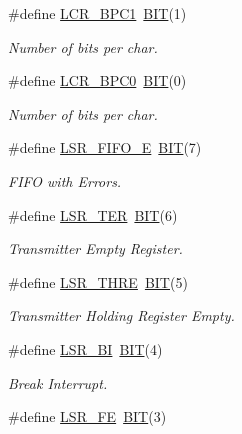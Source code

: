 \begin{DoxyCompactItemize}
\#define \hyperlink{group___serial_ga4271f672ad1c921995a3868074747d19}{L\+C\+R\+\_\+\+B\+P\+C1}~\hyperlink{group___serial_ga3a8ea58898cb58fc96013383d39f482c}{B\+IT}(1)
\begin{DoxyCompactList}\small\item\em Number of bits per char. \end{DoxyCompactList}\item 
\#define \hyperlink{group___serial_gae82a6d40fb6637ebdea0cf527594c3fc}{L\+C\+R\+\_\+\+B\+P\+C0}~\hyperlink{group___serial_ga3a8ea58898cb58fc96013383d39f482c}{B\+IT}(0)
\begin{DoxyCompactList}\small\item\em Number of bits per char. \end{DoxyCompactList}\item 
\#define \hyperlink{group___serial_ga17abffa14207797fba6c62875367d085}{L\+S\+R\+\_\+\+F\+I\+F\+O\+\_\+E}~\hyperlink{group___serial_ga3a8ea58898cb58fc96013383d39f482c}{B\+IT}(7)
\begin{DoxyCompactList}\small\item\em F\+I\+FO with Errors. \end{DoxyCompactList}\item 
\#define \hyperlink{group___serial_ga6b9fdb38c6b844ba25a7dba0f024e20c}{L\+S\+R\+\_\+\+T\+ER}~\hyperlink{group___serial_ga3a8ea58898cb58fc96013383d39f482c}{B\+IT}(6)
\begin{DoxyCompactList}\small\item\em Transmitter Empty Register. \end{DoxyCompactList}\item 
\#define \hyperlink{group___serial_ga8c1a828f5fe296a9c1668cf3e72c00c1}{L\+S\+R\+\_\+\+T\+H\+RE}~\hyperlink{group___serial_ga3a8ea58898cb58fc96013383d39f482c}{B\+IT}(5)
\begin{DoxyCompactList}\small\item\em Transmitter Holding Register Empty. \end{DoxyCompactList}\item 
\#define \hyperlink{group___serial_ga0fa2f414cac085b768774f2881321b60}{L\+S\+R\+\_\+\+BI}~\hyperlink{group___serial_ga3a8ea58898cb58fc96013383d39f482c}{B\+IT}(4)
\begin{DoxyCompactList}\small\item\em Break Interrupt. \end{DoxyCompactList}\item 
\#define \hyperlink{group___serial_gae3f9ccc88c615d1257ad400cf27af7eb}{L\+S\+R\+\_\+\+FE}~\hyperlink{group___serial_ga3a8ea58898cb58fc96013383d39f482c}{B\+IT}(3)

\end{DoxyCompactItemize}
